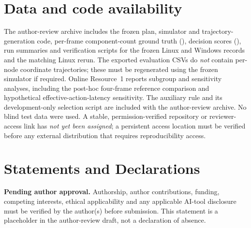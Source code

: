 \documentclass[10pt,a4paper]{article}
\begin{document}
\section*{Data and code availability}

The author-review archive includes the frozen plan, simulator and trajectory-generation code, per-frame component-count ground truth (), decision scores (), run summaries and verification scripts for the frozen Linux and Windows records and the matching Linux rerun. The exported evaluation CSVs do \emph{not} contain per-node coordinate trajectories; these must be regenerated using the frozen simulator if required. Online Resource~1 reports subgroup and sensitivity analyses, including the post-hoc four-frame reference comparison and hypothetical effective-action-latency sensitivity. The auxiliary rule and its development-only selection script are included with the author-review archive. No blind test data were used. A stable, permission-verified repository or reviewer-access link has \emph{not yet been assigned}; a persistent access location must be verified before any external distribution that requires reproducibility access.

\section*{Statements and Declarations}
\noindent\textbf{Pending author approval.} Authorship, author contributions, funding,
competing interests, ethical applicability and any applicable AI-tool disclosure
must be verified by the author(s) before submission. This statement is a
placeholder in the author-review draft, not a declaration of absence.



\end{document}
